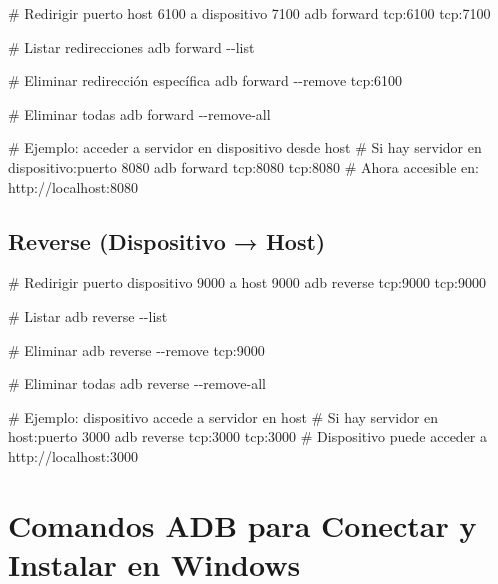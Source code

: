 \documentclass[
  doc,
  floatsintext,
  longtable,
  a4paper,
  nolmodern,
  notxfonts,
  notimes,
  12pt,
  colorlinks=true,linkcolor=blue,citecolor=blue,urlcolor=blue]{apa7}
\newenvironment{Shaded}{\begin{snugshade}}{\end{snugshade}}
\newcommand{\AttributeTok}[1]{\textcolor[rgb]{0.40,0.45,0.13}{#1}}
\newcommand{\CommentTok}[1]{\textcolor[rgb]{0.37,0.37,0.37}{#1}}
\newcommand{\ExtensionTok}[1]{\textcolor[rgb]{0.00,0.23,0.31}{#1}}
\newcommand{\NormalTok}[1]{\textcolor[rgb]{0.00,0.23,0.31}{#1}}
\begin{document}
\begin{Shaded}
\begin{Highlighting}[]
\CommentTok{\# Redirigir puerto host 6100 a dispositivo 7100}
\ExtensionTok{adb}\NormalTok{ forward tcp:6100 tcp:7100}

\CommentTok{\# Listar redirecciones}
\ExtensionTok{adb}\NormalTok{ forward }\AttributeTok{{-}{-}list}

\CommentTok{\# Eliminar redirección específica}
\ExtensionTok{adb}\NormalTok{ forward }\AttributeTok{{-}{-}remove}\NormalTok{ tcp:6100}

\CommentTok{\# Eliminar todas}
\ExtensionTok{adb}\NormalTok{ forward }\AttributeTok{{-}{-}remove{-}all}

\CommentTok{\# Ejemplo: acceder a servidor en dispositivo desde host}
\CommentTok{\# Si hay servidor en dispositivo:puerto 8080}
\ExtensionTok{adb}\NormalTok{ forward tcp:8080 tcp:8080}
\CommentTok{\# Ahora accesible en: http://localhost:8080}
\end{Highlighting}
\end{Shaded}

\subsection{Reverse (Dispositivo →
Host)}\label{reverse-dispositivo-host}

\begin{Shaded}
\begin{Highlighting}[]
\CommentTok{\# Redirigir puerto dispositivo 9000 a host 9000}
\ExtensionTok{adb}\NormalTok{ reverse tcp:9000 tcp:9000}

\CommentTok{\# Listar}
\ExtensionTok{adb}\NormalTok{ reverse }\AttributeTok{{-}{-}list}

\CommentTok{\# Eliminar}
\ExtensionTok{adb}\NormalTok{ reverse }\AttributeTok{{-}{-}remove}\NormalTok{ tcp:9000}

\CommentTok{\# Eliminar todas}
\ExtensionTok{adb}\NormalTok{ reverse }\AttributeTok{{-}{-}remove{-}all}

\CommentTok{\# Ejemplo: dispositivo accede a servidor en host}
\CommentTok{\# Si hay servidor en host:puerto 3000}
\ExtensionTok{adb}\NormalTok{ reverse tcp:3000 tcp:3000}
\CommentTok{\# Dispositivo puede acceder a http://localhost:3000}
\end{Highlighting}
\end{Shaded}

\section{Comandos ADB para Conectar y Instalar en
Windows}\label{comandos-adb-para-conectar-y-instalar-en-windows}
\end{document}

